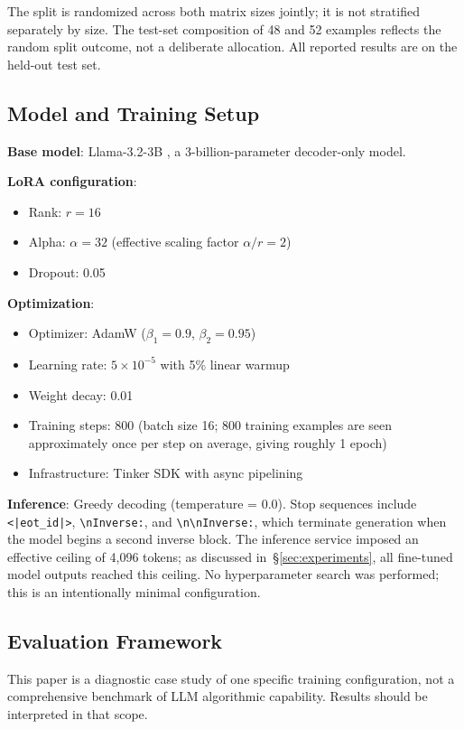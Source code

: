 The split is randomized across both matrix sizes jointly; it is not stratified separately by size. The test-set composition of 48 and 52 examples reflects the random split outcome, not a deliberate allocation. All reported results are on the held-out test set.

\subsection{Model and Training Setup}

\textbf{Base model}: Llama-3.2-3B \cite{llama32024}, a 3-billion-parameter decoder-only model.

\textbf{LoRA configuration}:
\begin{itemize}
    \item Rank: $r = 16$
    \item Alpha: $\alpha = 32$ (effective scaling factor $\alpha / r = 2$)
    \item Dropout: 0.05
\end{itemize}

\textbf{Optimization}:
\begin{itemize}
    \item Optimizer: AdamW ($\beta_1 = 0.9$, $\beta_2 = 0.95$)
    \item Learning rate: $5 \times 10^{-5}$ with 5\% linear warmup
    \item Weight decay: 0.01
    \item Training steps: 800 (batch size 16; 800 training examples are seen approximately once per step on average, giving roughly 1 epoch)
    \item Infrastructure: Tinker SDK with async pipelining
\end{itemize}

\textbf{Inference}: Greedy decoding (temperature = 0.0). Stop sequences include \texttt{<|eot\_id|>}, \verb|\nInverse:|, and \verb|\n\nInverse:|, which terminate generation when the model begins a second inverse block. The inference service imposed an effective ceiling of 4{,}096 tokens; as discussed in~\S\ref{sec:experiments}, all fine-tuned model outputs reached this ceiling. No hyperparameter search was performed; this is an intentionally minimal configuration.

\subsection{Evaluation Framework}

This paper is a diagnostic case study of one specific training configuration, not a comprehensive benchmark of LLM algorithmic capability. Results should be interpreted in that scope.

